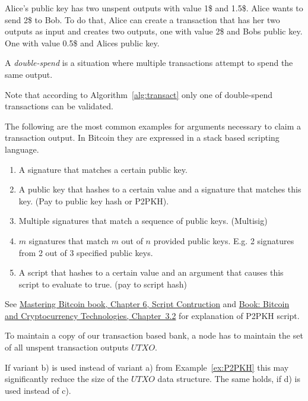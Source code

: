\begin{example}
Alice's public key has two unspent outputs with value 1\$ and 1.5\$. Alice wants to send 2\$ to Bob.
To do that, Alice can create a transaction that has her two outputs as input 
and creates two outputs, one with value 2\$ and Bobs public key. One with value 0.5\$ and Alices public key.
\end{example}


\begin{definition}
A \emph{double-spend} is a situation where multiple transactions attempt to spend the same output. 	
\end{definition}
\begin{note}
Note that according to Algorithm~\ref{alg:transact} only one of double-spend transactions can be validated. 
\end{note}



\begin{example}
	\label{ex:P2PKH}
	The following are the most common examples for arguments necessary to claim a transaction output. In Bitcoin they are expressed in a stack based scripting language.
	\begin{enumerate}[label=\alph*)]
		\item A signature that matches a certain public key.
		\item A public key that hashes to a certain value and a signature that matches this key. (Pay to public key hash or P2PKH).
		\item Multiple signatures that match a sequence of public keys. (Multisig)
		\item $m$ signatures that match $m$ out of $n$ provided public keys. 
		E.g. 2 signatures from 2 out of 3 specified public keys.
		\item A script that hashes to a certain value and an argument that causes this script to evaluate to true. (pay to script hash)
	\end{enumerate}
	See \href{https://github.com/bitcoinbook/bitcoinbook/blob/develop/ch06.asciidoc#script-construction-lock--unlock}{Mastering Bitcoin book, Chapter 6, Script Contruction}  and \href{https://d28rh4a8wq0iu5.cloudfront.net/bitcointech/readings/princeton_bitcoin_book.pdf}{Book: Bitcoin and Cryptocurrency Technologies, Chapter~3.2} for explanation of P2PKH script.
\end{example}

\begin{note}
To maintain a copy of our transaction based bank, a node has to maintain the set of all unspent transaction outputs $UTXO$. 

If variant b) is used instead of variant a) from Example~\ref{ex:P2PKH} this may significantly reduce the size of the $UTXO$ data structure. The same holds, if d) is used instead of c).
\end{note}	

